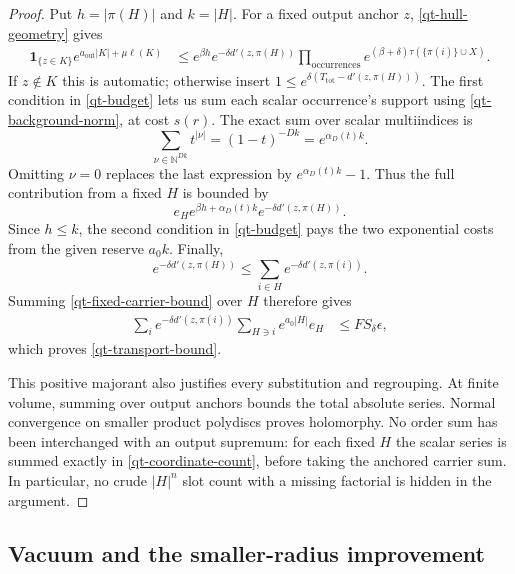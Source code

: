 \begin{proof}
Put $h=|\pi(H)|$ and $k=|H|$. For a fixed output anchor $z$,
\eqref{qt-hull-geometry} gives
\begin{align}
 \mathbf1_{\{z\in K\}}
 e^{a_{\mathrm{out}}|K|+\mu\ell(K)}
 &\le e^{\beta h}e^{-\delta d'(z,\pi(H))}
       \prod_{\text{occurrences}}
       e^{(\beta+\delta)\tau(\{\pi(i)\}\cup X)}.       \label{qt-anchor-hull}
\end{align}
If $z\notin K$ this is automatic; otherwise insert
$1\le e^{\delta(T_{\mathrm{tot}}-d'(z,\pi(H)))}$.
The first condition in \eqref{qt-budget} lets us sum each scalar
occurrence's support using \eqref{qt-background-norm}, at cost $s(r)$.
The exact sum over scalar multiindices is
\begin{equation}\label{qt-coordinate-count}
 \sum_{\nu\in\mathbb N^{Dk}}t^{|\nu|}
    =(1-t)^{-Dk}=e^{\alpha_D(t)k}.
\end{equation}
Omitting $\nu=0$ replaces the last expression by
$e^{\alpha_D(t)k}-1$. Thus the full contribution from a fixed $H$
is bounded by
\begin{equation}\label{qt-fixed-carrier-bound}
 e_H e^{\beta h+\alpha_D(t)k}
                  e^{-\delta d'(z,\pi(H))}.
\end{equation}
Since $h\le k$, the second condition in \eqref{qt-budget} pays
the two exponential costs from the given reserve $a_0 k$.
Finally,
\begin{equation}\label{qt-reroot}
 e^{-\delta d'(z,\pi(H))}
    \le\sum_{i\in H}e^{-\delta d'(z,\pi(i))}.
\end{equation}
Summing \eqref{qt-fixed-carrier-bound} over $H$ therefore gives
\begin{align}
 \sum_i e^{-\delta d'(z,\pi(i))}
             \sum_{H\ni i}e^{a_0|H|}e_H
 &\le F S_\delta\epsilon,                              \label{qt-final-majorant}
\end{align}
which proves \eqref{qt-transport-bound}.

This positive majorant also justifies every substitution and
regrouping. At finite volume, summing over output anchors bounds
the total absolute series. Normal convergence on smaller product
polydiscs proves holomorphy. No order sum has been interchanged
with an output supremum: for each fixed $H$ the scalar series is
summed exactly in \eqref{qt-coordinate-count}, before taking the
anchored carrier sum. In particular, no crude $|H|^n$ slot count
with a missing factorial is hidden in the argument.
\end{proof}

\subsection{Vacuum and the smaller-radius improvement}

